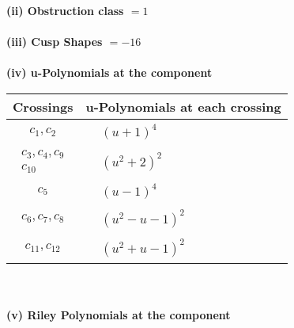 \documentclass[1p]{elsarticle_modified}
\theoremstyle{definition}
\begin{document}
\flushleft \textbf{(ii) Obstruction class $= 1$}\\~\\
\flushleft \textbf{(iii) Cusp Shapes $= -16$}\\~\\
\newpage\renewcommand{\arraystretch}{1}
\flushleft \textbf{(iv) u-Polynomials at the component}\newline \\
\begin{tabular}{m{50pt}|m{274pt}}
Crossings & \hspace{64pt}u-Polynomials at each crossing \\
\hline $$\begin{aligned}c_{1},c_{2}\end{aligned}$$&$\begin{aligned}
&(u+1)^4
\end{aligned}$\\
\hline $$\begin{aligned}c_{3},c_{4},c_{9}\\c_{10}\end{aligned}$$&$\begin{aligned}
&(u^2+2)^2
\end{aligned}$\\
\hline $$\begin{aligned}c_{5}\end{aligned}$$&$\begin{aligned}
&(u-1)^4
\end{aligned}$\\
\hline $$\begin{aligned}c_{6},c_{7},c_{8}\end{aligned}$$&$\begin{aligned}
&(u^2- u-1)^2
\end{aligned}$\\
\hline $$\begin{aligned}c_{11},c_{12}\end{aligned}$$&$\begin{aligned}
&(u^2+u-1)^2
\end{aligned}$\\
\hline
\end{tabular}\\~\\
\newpage\renewcommand{\arraystretch}{1}
\flushleft \textbf{(v) Riley Polynomials at the component}\newline \\
\end{document}
